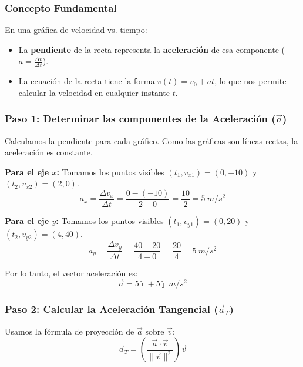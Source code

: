 \documentclass[12pt, a4paper]{article}
\begin{document}
\subsubsection*{Concepto Fundamental}
En una gráfica de velocidad vs. tiempo:
\begin{itemize}
    \item La \textbf{pendiente} de la recta representa la \textbf{aceleración} de esa componente ($a = \frac{\Delta v}{\Delta t}$).
    \item La ecuación de la recta tiene la forma $v(t) = v_0 + at$, lo que nos permite calcular la velocidad en cualquier instante $t$.
\end{itemize}

\subsubsection*{Paso 1: Determinar las componentes de la Aceleración ($\vec{a}$)}
Calculamos la pendiente para cada gráfico. Como las gráficas son líneas rectas, la aceleración es constante.

\textbf{Para el eje $x$:}
Tomamos los puntos visibles $(t_1, v_{x1}) = (0, -10)$ y $(t_2, v_{x2}) = (2, 0)$.
\begin{equation}
a_x = \frac{\Delta v_x}{\Delta t} = \frac{0 - (-10)}{2 - 0} = \frac{10}{2} = \SI{5}{m/s^2}
\end{equation}

\textbf{Para el eje $y$:}
Tomamos los puntos visibles $(t_1, v_{y1}) = (0, 20)$ y $(t_2, v_{y2}) = (4, 40)$.
\begin{equation}
a_y = \frac{\Delta v_y}{\Delta t} = \frac{40 - 20}{4 - 0} = \frac{20}{4} = \SI{5}{m/s^2}
\end{equation}

Por lo tanto, el vector aceleración es:
\begin{equation}
\vec{a} = 5\hat{\imath} + 5\hat{\jmath} \, \si{m/s^2}
\end{equation}

\subsubsection*{Paso 2: Calcular la Aceleración Tangencial ($\vec{a}_T$)}
Usamos la fórmula de proyección de $\vec{a}$ sobre $\vec{v}$:
\begin{equation}
\vec{a}_T = \left( \frac{\vec{a} \cdot \vec{v}}{\|\vec{v}\|^2} \right) \vec{v}
\end{equation}
\end{document}
